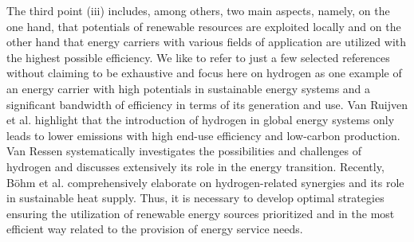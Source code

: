 The third point (iii) includes, among others, two main aspects, namely, on the one hand, that potentials of renewable resources are exploited locally and on the other hand that energy carriers with various fields of application are utilized with the highest possible efficiency. We like to refer to just a few selected references without claiming to be exhaustive and focus here on hydrogen as one example of an energy carrier with high potentials in sustainable energy systems and a significant bandwidth of efficiency in terms of its generation and use. Van Ruijven et al. \cite{van2007potential} highlight that the introduction of hydrogen in global energy systems only leads to lower emissions with high end-use efficiency and low-carbon production. Van Ressen \cite{van2020hydrogen} systematically investigates the possibilities and challenges of hydrogen and discusses extensively its role in the energy transition. Recently, Böhm et al. \cite{bohm2021power} comprehensively elaborate on hydrogen-related synergies and its role in sustainable heat supply. Thus, it is necessary to develop optimal strategies ensuring the utilization of renewable energy sources prioritized and in the most efficient way related to the provision of energy service needs.\newline 

